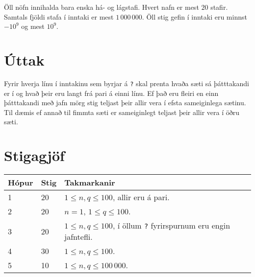 Öll nöfn innihalda bara enska há- og lágstafi. Hvert nafn er mest $20$ stafir.
Samtals fjöldi stafa í inntaki er mest $1 \, 000 \, 000$.
Öll stig gefin í inntaki eru minnst $-10^9$ og mest $10^9$.

\section*{Úttak}
Fyrir hverja línu í inntakinu sem byrjar á \texttt{?} skal prenta hvaða sæti sá
þátttakandi er í og hvað þeir eru langt frá pari á einni línu.
Ef það eru fleiri en einn þátttakandi með jafn mörg stig teljast þeir allir vera í efsta
sameiginlega sætinu.
Til dæmis ef annað til fimmta sæti er sameiginlegt teljast þeir allir vera í öðru sæti.

\section*{Stigagjöf}
\begin{tabular}{|l|l|l|}
\hline
Hópur & Stig & Takmarkanir \\ \hline
1     & 20   & $1 \leq n, q \leq 100$, allir eru á pari. \\ \hline
2     & 20   & $n = 1$, $1 \leq q \leq 100$. \\ \hline
3     & 20   & $1 \leq n, q \leq 100$, í öllum \texttt{?} fyrirspurnum eru engin jafntefli. \\ \hline
4     & 30   & $1 \leq n, q \leq 100$. \\ \hline
5     & 10   & $1 \leq n, q \leq 100 \, 000$. \\ \hline
\end{tabular}

